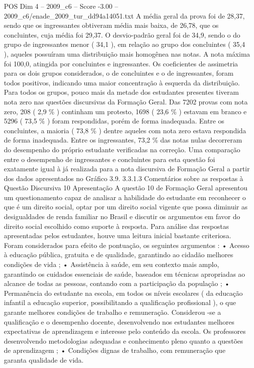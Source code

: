 \begin{textsample}{POS Dim 4 – 2009\_c6 – Score -3.00 – 2009\_c6/enade\_2009\_tur\_dd94a14051.txt}
A média geral da prova foi de 28,37, sendo que os ingressantes obtiveram média mais baixa, de 26,78, que os concluintes, cuja média foi 29,37.
O desvio-padrão geral foi de 34,9, sendo o do grupo de ingressantes menor ( 34,1 ), em relação ao grupo dos concluintes ( 35,4 ), aqueles possuíram uma distribuição mais homogênea nas notas.
A nota máxima foi 100,0, atingida por concluintes e ingressantes.
Os coeficientes de assimetria para os dois grupos considerados, o de concluintes e o de ingressantes, foram todos positivos, indicando uma maior concentração à esquerda da distribuição.
Para todos os grupos, pouco mais da metade dos estudantes presentes tiveram nota zero nas questões discursivas da Formação Geral.
Das 7202 provas com nota zero, 208 ( 2,9 \% ) continham um protesto, 1698 ( 23,6 \% ) estavam em branco e 5296 ( 73,5 \% ) foram respondidas, porém de forma inadequada.
Entre os concluintes, a maioria ( 73,8 \% ) dentre aqueles com nota zero estava respondida de forma inadequada.
Entre os ingressantes, 73,2 \% das notas nulas decorreram do desempenho do próprio estudante verificadas na correção.
Uma comparação entre o desempenho de ingressantes e concluintes para esta questão foi exatamente igual à já realizada para a nota discursiva de Formação Geral a partir dos dados apresentados no Gráfico 3.9. 3.3.1.3 Comentários sobre as respostas à Questão Discursiva 10 Apresentação A questão 10 de Formação Geral apresentou um questionamento capaz de analisar a habilidade do estudante em reconhecer o que é um direito social, optar por um direito social vigente que possa diminuir as desigualdades de renda familiar no Brasil e discutir os argumentos em favor do direito social escolhido como suporte à resposta.
Para análise das respostas apresentadas pelos estudantes, houve uma leitura inicial bastante criteriosa.
Foram considerados para efeito de pontuação, os seguintes argumentos : • Acesso à educação pública, gratuita e de qualidade, garantindo ao cidadão melhores condições de vida ; • Assistência à saúde, em seu contexto mais amplo, garantindo os cuidados essenciais de saúde, baseados em técnicas apropriadas ao alcance de todas as pessoas, contando com a participação da população ; • Permanência do estudante na escola, em todos os níveis escolares ( da educação infantil a educação superior, possibilitando a qualificação profissional ), o que garante melhores condições de trabalho e remuneração.
Considerou -se a qualificação e o desempenho docente, desenvolvendo nos estudantes melhores expectativas de aprendizagem e interesse pelo conteúdo da escola.
Os professores desenvolvendo metodologias adequadas e conhecimento pleno quanto a questões de aprendizagem ; • Condições dignas de trabalho, com remuneração que garanta qualidade de vida.

\end{textsample}
